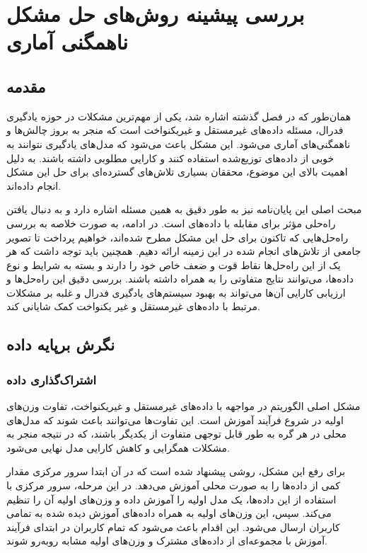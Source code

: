 \chapter{بررسی پیشینه روش‌های حل مشکل ناهمگنی آماری}

\section{مقدمه}
همان‌طور که در فصل گذشته اشاره شد، یکی از مهم‌ترین مشکلات در حوزه یادگیری فدرال، مسئله داده‌های غیرمستقل و غیریکنواخت
است که منجر به بروز چالش‌ها و ناهمگنی‌های آماری می‌شود. این مشکل باعث می‌شود که مدل‌های یادگیری نتوانند به خوبی از داده‌های توزیع‌شده استفاده کنند و کارایی مطلوبی داشته باشند. به دلیل اهمیت بالای این موضوع، محققان بسیاری تلاش‌های گسترده‌ای برای حل این مشکل انجام داده‌اند.

مبحث اصلی این پایان‌نامه نیز به طور دقیق به همین مسئله اشاره دارد و به دنبال یافتن راه‌حلی مؤثر برای مقابله با داده‌های
است. در ادامه، به صورت خلاصه به بررسی راه‌حل‌هایی که تاکنون برای حل این مشکل مطرح شده‌اند، خواهیم پرداخت تا تصویر جامعی از تلاش‌های انجام شده در این زمینه ارائه دهیم. همچنین باید توجه داشت که هر یک از این راه‌حل‌ها نقاط قوت و ضعف خاص خود را دارند و بسته به شرایط و نوع داده‌ها، می‌توانند نتایج متفاوتی را به همراه داشته باشند. بررسی دقیق این راه‌حل‌ها و ارزیابی کارایی آن‌ها می‌تواند به بهبود سیستم‌های یادگیری فدرال و غلبه بر مشکلات مرتبط با داده‌های غیرمستقل و غیر یکنواخت کمک شایانی کند.

\section{نگرش برپایه داده}
\subsection{اشتراک‌گذاری داده}
مشکل اصلی الگوریتم
در مواجهه با داده‌های غیرمستقل و غیریکنواخت، تفاوت وزن‌های اولیه در شروع فرآیند آموزش است. این تفاوت‌ها می‌توانند باعث شوند که مدل‌های محلی در هر گره به طور قابل توجهی متفاوت از یکدیگر باشند، که در نتیجه منجر به مشکلات همگرایی و کاهش کارایی مدل نهایی می‌شود.

برای رفع این مشکل، روشی پیشنهاد شده است که در آن ابتدا سرور مرکزی مقدار کمی از داده‌ها را به صورت محلی آموزش می‌دهد. در این مرحله، سرور مرکزی با استفاده از این داده‌ها، یک مدل اولیه را آموزش داده و وزن‌های اولیه آن را تنظیم می‌کند. سپس، این وزن‌های اولیه به همراه داده‌های آموزش دیده شده به تمامی کاربران ارسال می‌شود. این اقدام باعث می‌شود که تمام کاربران در ابتدای فرآیند آموزش با مجموعه‌ای از داده‌های مشترک و وزن‌های اولیه مشابه روبه‌رو شوند.

